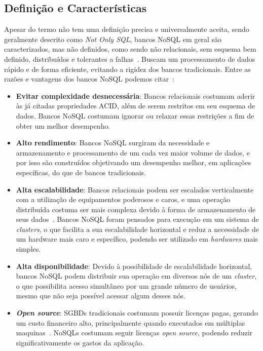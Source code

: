 \subsection{Definição e Características}
Apesar do termo não tem uma definição precisa e universalmente aceita, sendo geralmente descrito como \emph{Not Only SQL}, bancos NoSQL em geral são caracterizados, mas não definidos, como sendo não relacionais, sem esquema bem definido, distribuídos e tolerantes a falhas~\cite{pramod}. Buscam um processamento de dados rápido e de forma eficiente, evitando a rigidez dos bancos tradicionais. 
	Entre as razões e vantagens dos bancos NoSQL podemos citar~\cite{chrisnosql}:
    \begin{itemize}
    \item \textbf{Evitar complexidade desnecessária}: Bancos relacionais costumam aderir às já citadas propriedades ACID, além de serem restritos em seu esquema de dados. Bancos NoSQL costumam ignorar ou relaxar essas restrições a fim de obter um melhor desempenho.
    \item \textbf{Alto rendimento}: Bancos NoSQL surgiram da necessidade e armazenamento e processamento de um cada vez maior volume de dados, e por isso são construídos objetivando um desempenho melhor, em aplicações específicas, do que de bancos tradicionais.
    \item \textbf{Alta escalabilidade}: Bancos relacionais podem ser escalados verticalmente com a utilização de equipamentos poderosos e caros, e uma operação distribuída costuma ser mais complexa devido à forma de armazenamento de seus dados~\cite{leavitt2010nosql}. Bancos NoSQL foram pensados para execução em um sistema de \emph{clusters}, o que facilita a sua escalabilidade horizontal e reduz a necessidade de um hardware mais caro e específico, podendo ser utilizado em \emph{hardwares} mais simples. 
    \item \textbf{Alta disponibilidade}: Devido à possibilidade de escalabilidade horizontal, bancos NoSQL podem distribuir sua operação em diversos nós de um \emph{cluster}, o que possibilita acesso simultâneo por um grande número de usuários, mesmo que não seja possível acessar algum desses nós. 
    \item \textbf{\emph{Open source}}: SGBDs tradicionais costumam possuir licenças pagas, gerando um custo financeiro alto, principalmente quando executados em múltiplas maquinas~\cite{pramod}. NoSQLs costumam seguir licenças \emph{open source}, podendo reduzir significativamente os gastos da aplicação. 
\end{itemize}

